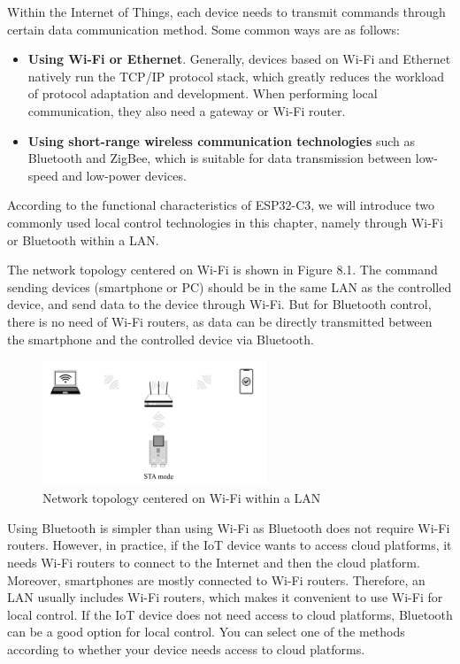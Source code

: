 \documentclass[a4paper,12pt,openany]{book}
\begin{document}
Within the Internet of Things, each device needs to transmit commands through certain data communication method. Some common ways are as follows:

\begin{itemize}[leftmargin=1.5em]
    \item \textbf{Using Wi-Fi or Ethernet}. Generally, devices based on Wi-Fi and Ethernet natively run the TCP/IP protocol stack, which greatly reduces the workload of protocol adaptation and development. When performing local communication, they also need a gateway or Wi-Fi router.
    \item \textbf{Using short-range wireless communication technologies} such as Bluetooth and ZigBee, which is suitable for data transmission between low-speed and low-power devices.
\end{itemize}

According to the functional characteristics of ESP32-C3, we will introduce two commonly used local control technologies in this chapter, namely through Wi-Fi or Bluetooth within a LAN.

The network topology centered on Wi-Fi is shown in Figure 8.1. The command sending devices (smartphone or PC) should be in the same LAN as the controlled device, and send data to the device through Wi-Fi. But for Bluetooth control, there is no need of Wi-Fi routers, as data can be directly transmitted between the smartphone and the controlled device via Bluetooth.

\begin{figure}[!h]
    \centering
    \includegraphics[width=0.6\textwidth]{D8Z/8-1}
    \caption{Network topology centered on Wi-Fi within a LAN}
\end{figure}

Using Bluetooth is simpler than using Wi-Fi as Bluetooth does not require Wi-Fi routers. However, in practice, if the IoT device wants to access cloud platforms, it needs Wi-Fi routers to connect to the Internet and then the cloud platform. Moreover, smartphones are mostly connected to Wi-Fi routers. Therefore, an LAN usually includes Wi-Fi routers, which makes it convenient to use Wi-Fi for local control. If the IoT device does not need access to cloud platforms, Bluetooth can be a good option for local control. You can select one of the methods according to whether your device needs access to cloud platforms.
\end{document}
